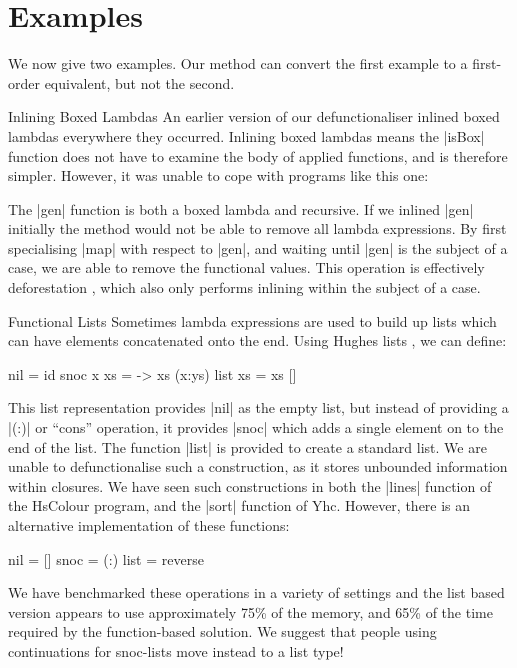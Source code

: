 \section{Examples}
\label{secF:examples}

We now give two examples. Our method can convert the first example to a first-order equivalent, but not the second.

\begin{examplename}{Inlining Boxed Lambdas}
\label{exF:inlining_boxed_lambdas}
An earlier version of our defunctionaliser inlined boxed lambdas everywhere they occurred. Inlining boxed lambdas means the |isBox| function does not have to examine the body of applied functions, and is therefore simpler. However, it was unable to cope with programs like this one:


The |gen| function is both a boxed lambda and recursive. If we inlined |gen| initially the method would not be able to remove all lambda expressions. By first specialising |map| with respect to |gen|, and waiting until |gen| is the subject of a case, we are able to remove the functional values. This operation is effectively deforestation \cite{wadler:deforestation}, which also only performs inlining within the subject of a case.
\end{examplename}

\begin{examplename}{Functional Lists}
\label{exF:functional_lists}
Sometimes lambda expressions are used to build up lists which can have elements concatenated onto the end. Using Hughes lists \cite{hughes:lists}, we can define:

\begin{code}
nil = id
snoc x xs = \ys -> xs (x:ys)
list xs = xs []
\end{code}

This list representation provides |nil| as the empty list, but instead of providing a |(:)| or ``cons'' operation, it provides |snoc| which adds a single element on to the end of the list. The function |list| is provided to create a standard list. We are unable to defunctionalise such a construction, as it stores unbounded information within closures. We have seen such constructions in both the |lines| function of the HsColour program, and the |sort| function of Yhc. However, there is an alternative implementation of these functions:

\begin{code}
nil = []
snoc = (:)
list = reverse
\end{code}

We have benchmarked these operations in a variety of settings and the list based version appears to use approximately 75\% of the memory, and 65\% of the time required by the function-based solution. We suggest that people using continuations for snoc-lists move instead to a list type!
\end{examplename}


